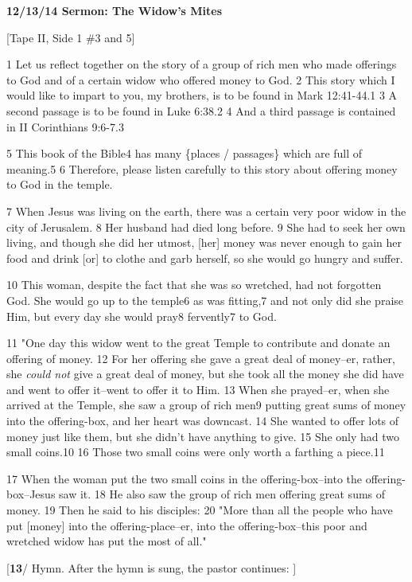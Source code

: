 
\textbf{12/13/14 Sermon: The Widow's Mites}

[Tape II, Side 1 \#3 and 5]

1 Let us reflect together on the story of a group of rich men who made offerings
to God and of a certain widow who offered money to God. 2 This story which I would
like to impart to you, my brothers, is to be found in Mark 12:41-44.1 3 A second
passage is to be found in Luke 6:38.2 4 And a third passage is contained in II
Corinthians 9:6-7.3

5 This book of the Bible4 has many \{places / passages\} which are full of meaning.5
6 Therefore, please listen carefully to this story about offering money to God
in the temple.

7 When Jesus was living on the earth, there was a certain very poor widow in the
city of Jerusalem. 8 Her husband had died long before. 9 She had to seek her own
living, and though she did her utmost, [her] money was never enough to gain her
food and drink [or] to clothe and garb herself, so she would go hungry and suffer.

10 This woman, despite the fact that she was so wretched, had not forgotten God.
She would go up to the temple6 as was fitting,7 and not only did she praise Him,
but every day she would pray8 fervently7 to God.

11 "One day this widow went to the great Temple to contribute and donate
an offering of money. 12 For her offering she gave a great deal of money--er, rather,
she \textit{could not} give a great deal of money, but she took all the money she
did have and went to offer it--went to offer it to Him. 13 When she prayed--er,
when she arrived at the Temple, she saw a group of rich men9 putting great sums
of money into the offering-box, and her heart was downcast. 14 She wanted to offer
lots of money just like them, but she didn't have anything to give. 15 She only
had two small coins.10 16 Those two small coins were only worth a farthing a piece.11

17 When the woman put the two small coins in the offering-box--into the offering-box--Jesus
saw it. 18 He also saw the group of rich men offering great sums of money. 19 Then
he said to his disciples: 20 "More than all the people who have put [money]
into the offering-place--er, into the offering-box--this poor and wretched widow
has put the most of all."

[\textbf{13}/ Hymn. After the hymn is sung, the pastor continues: ]

